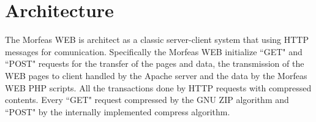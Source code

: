 \section{Architecture}
The Morfeas WEB is architect as a classic server-client system that using HTTP messages for comunication. Specifically the Morfeas WEB initialize ``GET" and ``POST" requests
for the transfer of the pages and data, the transmission of the WEB pages to client handled by the Apache server and the data by the Morfeas WEB PHP scripts. 
All the transactions done by HTTP requests with compressed contents. Every ``GET" request compressed by the GNU ZIP algorithm and ``POST" by the internally implemented compress algorithm.





